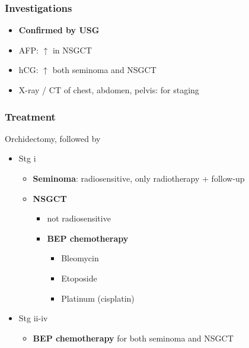 \documentclass[
  14pt,
]{extarticle}
\providecommand{\tightlist}{%
  \setlength{\itemsep}{0pt}\setlength{\parskip}{0pt}}
\begin{document}
\hypertarget{investigations-7}{%
\subsubsection{Investigations}\label{investigations-7}}

\begin{itemize}
\tightlist
\item
  \textbf{Confirmed by USG}
\item
  AFP: \(\uparrow\) in NSGCT
\item
  hCG: \(\uparrow\) both seminoma and NSGCT
\item
  X-ray / CT of chest, abdomen, pelvis: for staging
\end{itemize}

\hypertarget{treatment-8}{%
\subsubsection{Treatment}\label{treatment-8}}

Orchidectomy, followed by

\begin{itemize}
\tightlist
\item
  Stg i

  \begin{itemize}
  \tightlist
  \item
    \textbf{Seminoma}: radiosensitive, only radiotherapy + follow-up
  \item
    \textbf{NSGCT}

    \begin{itemize}
    \tightlist
    \item
      not radiosensitive
    \item
      \textbf{BEP chemotherapy}

      \begin{itemize}
      \tightlist
      \item
        Bleomycin
      \item
        Etoposide
      \item
        Platinum (cisplatin)
      \end{itemize}
    \end{itemize}
  \end{itemize}
\item
  Stg ii-iv

  \begin{itemize}
  \tightlist
  \item
    \textbf{BEP chemotherapy} for both seminoma and NSGCT
  \end{itemize}
\end{itemize}
\end{document}
